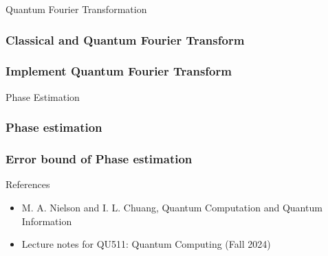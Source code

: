\documentclass[9pt]{beamer}
\begin{document}
    \begin{section}{Quantum Fourier Transformation}
        \begin{frame}
            \frametitle{Classical and Quantum Fourier Transform}
            
        \end{frame}

        \begin{frame}
            \frametitle{Implement Quantum Fourier Transform}
            
        \end{frame}
    \end{section}


    \begin{section}{Phase Estimation}
        \begin{frame}
            \frametitle{Phase estimation}
            
        \end{frame}

        \begin{frame}
            \frametitle{Error bound of Phase estimation}
            
        \end{frame}
    \end{section}
    \begin{frame}{References}
        
        \begin{itemize}
            \item M. A. Nielson and I. L. Chuang, Quantum Computation and Quantum Information
            \item Lecture notes for QU511: Quantum Computing (Fall 2024)
        \end{itemize}
        \vspace{6cm}
    \end{frame}
\end{document}
